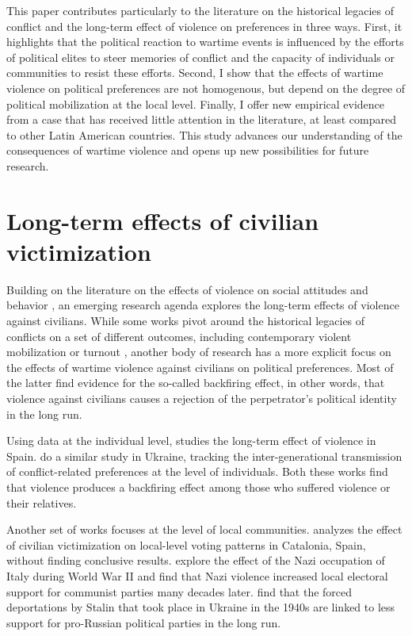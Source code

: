 \documentclass[12pt, notitlepage]{article}
\begin{document}
This paper contributes particularly to the literature on the historical legacies of conflict \citep{Daly:2012aa, Weintraub:2015aa, Osorio:2018aa, Zhukov:2018aa, Osorio:2021aa} and the long-term effect of violence on preferences \citep{Balcells:2012aa, Lupu:2017aa, Fontana:2017aa, Rozenas:2017aa, Rozenas:2019aa} in three ways.
First, it highlights that the political reaction to wartime events is influenced by the efforts of political elites to steer memories of conflict and the capacity of individuals or communities to resist these efforts.
Second, I show that the effects of wartime violence on political preferences are not homogenous, but depend on the degree of political mobilization at the local level.
Finally, I offer new empirical evidence from a case that has received little attention in the literature, at least compared to other Latin American countries.
This study advances our understanding of the consequences of wartime violence and opens up new possibilities for future research.

\section*{Long-term effects of civilian victimization}

Building on the literature on the effects of violence on social attitudes and behavior \citep{Bauer:2016aa}, an emerging research agenda explores the long-term effects of violence against civilians.
While some works pivot around the historical legacies of conflicts on a set of different outcomes, including contemporary violent mobilization or turnout \citep{Daly:2012aa, Weintraub:2015aa, Osorio:2018aa, Zhukov:2018aa, Osorio:2021aa}, another body of research has a more explicit focus on the effects of wartime violence against civilians on political preferences.
Most of the latter find evidence for the so-called backfiring effect, in other words, that violence against civilians causes a rejection of the perpetrator's political identity in the long run.

Using data at the individual level, \citet{Balcells:2012aa} studies the long-term effect of violence in Spain.
\citet{Lupu:2017aa} do a similar study in Ukraine, tracking the inter-generational transmission of conflict-related preferences at the level of individuals.
Both these works find that violence produces a backfiring effect among those who suffered violence or their relatives.

Another set of works focuses at the level of local communities.
\citet{Balcells:2010ab} analyzes the effect of civilian victimization on local-level voting patterns in Catalonia, Spain, without finding conclusive results.
\citet{Fontana:2017aa} explore the effect of the Nazi occupation of Italy during World War II and find that Nazi violence increased local electoral support for communist parties many decades later.
\citet{Rozenas:2017aa} find that the forced deportations by Stalin that took place in Ukraine in the 1940s are linked to less support for pro-Russian political parties in the long run.
\end{document}
